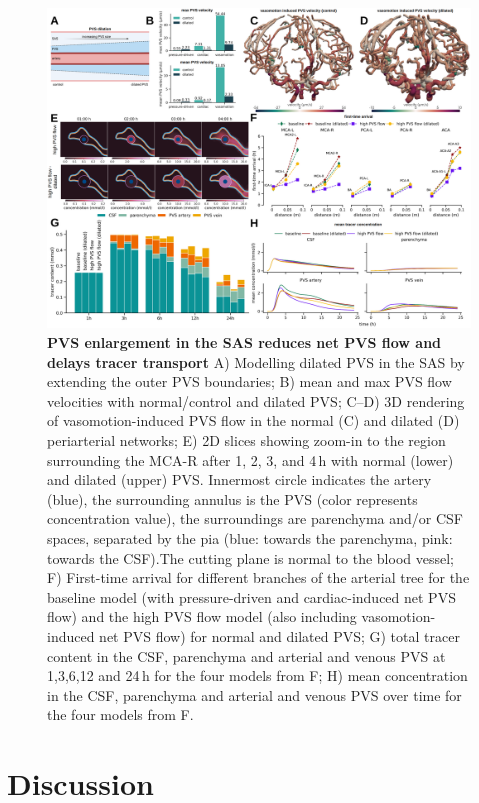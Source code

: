 \documentclass[fleqn,10pt]{wlscirep}
\begin{document}
\begin{figure}
    \centering
    \includegraphics[width=1 \textwidth]{figures/figure5.png}
\caption{\textbf{PVS enlargement in the SAS reduces net PVS flow and delays tracer transport}
A) Modelling dilated PVS in the SAS by extending the outer PVS boundaries;
B) mean and max PVS flow velocities with normal/control and dilated PVS;
C--D) 3D rendering of vasomotion-induced PVS flow in the normal (C) and dilated (D) periarterial networks; 
E) 2D slices showing zoom-in to the region surrounding the MCA-R after 1, 2, 3, and 4\,h with normal (lower) and dilated (upper) PVS. Innermost circle indicates the artery (blue), the surrounding annulus is the PVS (color represents concentration value), the surroundings are parenchyma and/or CSF spaces, separated by the pia (blue: towards the parenchyma, pink: towards the CSF).The cutting plane is normal to the blood vessel; 
F) First-time arrival for different branches of the arterial tree for the baseline model (with pressure-driven and cardiac-induced net PVS flow) and the high PVS flow model (also including vasomotion-induced net PVS flow) for normal and dilated PVS;
G) total tracer content in the CSF, parenchyma and arterial and venous PVS at 1,3,6,12 and 24\,h for the four models from F;
H) mean concentration in the CSF, parenchyma and arterial and venous PVS over time for the four models from F.
}
    \label{fig:enlargement}
\end{figure}

\section*{Discussion}
\end{document}
